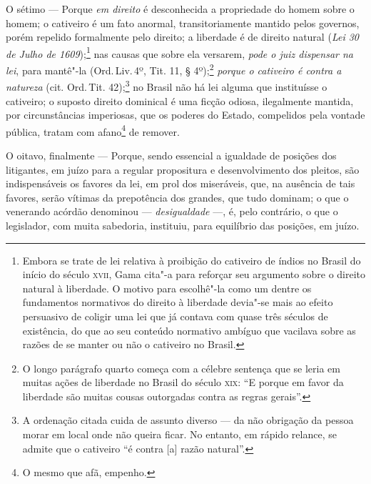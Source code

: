 O sétimo --- Porque \emph{em direito} é desconhecida a propriedade do
homem sobre o homem; o cativeiro é um fato anormal, transitoriamente
mantido pelos governos, porém repelido formalmente pelo direito; a
liberdade é de direito natural (\emph{Lei 30 de Julho de
1609});\footnote{Embora se trate de lei relativa à proibição do
  cativeiro de índios no Brasil do início do século \textsc{xvii}, Gama cita"-a
  para reforçar seu argumento sobre o direito natural à liberdade. O
  motivo para escolhê"-la como um dentre os fundamentos normativos do
  direito à liberdade devia"-se mais ao efeito persuasivo de coligir uma
  lei que já contava com quase três séculos de existência, do que ao seu
  conteúdo normativo ambíguo que vacilava sobre as razões de se manter
  ou não o cativeiro no Brasil.} nas causas que sobre ela versarem,
\emph{pode o juiz dispensar na lei}, para mantê"-la (Ord.\,Liv.\,4º, Tit.
11, § 4º);\footnote{O longo parágrafo quarto começa com a célebre
  sentença que se leria em muitas ações de liberdade no Brasil do século
  \textsc{xix}: ``E porque em favor da liberdade são muitas cousas outorgadas
  contra as regras gerais''.} \emph{porque o cativeiro é contra a
natureza} (cit. Ord.\,Tit. 42);\footnote{A ordenação citada cuida de
  assunto diverso --- da não obrigação da pessoa morar em local onde não
  queira ficar. No entanto, em rápido relance, se admite que o cativeiro
  ``é contra {[}a{]} razão natural''.} no Brasil não há lei alguma que
instituísse o cativeiro; o suposto direito dominical é uma ficção
odiosa, ilegalmente mantida, por circunstâncias imperiosas, que os
poderes do Estado, compelidos pela vontade pública, tratam com
afano\footnote{O mesmo que afã, empenho.} de remover.

O oitavo, finalmente --- Porque, sendo essencial a igualdade de
posições dos litigantes, em juízo para a regular propositura e
desenvolvimento dos pleitos, são indispensáveis os favores da lei, em
prol dos miseráveis, que, na ausência de tais favores, serão vítimas da
prepotência dos grandes, que tudo dominam; o que o venerando acórdão
denominou --- \emph{desigualdade} ---, é, pelo contrário, o que o
legislador, com muita sabedoria, instituiu, para equilíbrio das
posições, em juízo.

\asterisc

